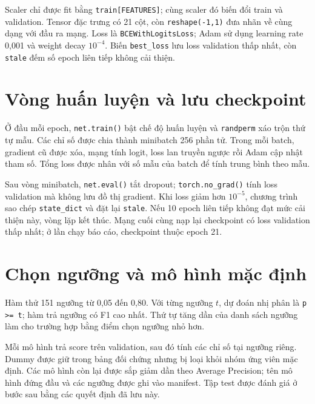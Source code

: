 Scaler chỉ được fit bằng \texttt{train[FEATURES]}; cùng scaler đó biến đổi train và validation. Tensor đặc trưng có 21 cột, còn \texttt{reshape(-1,1)} đưa nhãn về cùng dạng với đầu ra mạng. Loss là \texttt{BCEWithLogitsLoss}; Adam sử dụng learning rate 0,001 và weight decay $10^{-4}$. Biến \texttt{best\_loss} lưu loss validation thấp nhất, còn \texttt{stale} đếm số epoch liên tiếp không cải thiện.

\section{Vòng huấn luyện và lưu checkpoint}

Ở đầu mỗi epoch, \texttt{net.train()} bật chế độ huấn luyện và \texttt{randperm} xáo trộn thứ tự mẫu. Các chỉ số được chia thành minibatch 256 phần tử. Trong mỗi batch, gradient cũ được xóa, mạng tính logit, loss lan truyền ngược rồi Adam cập nhật tham số. Tổng loss được nhân với số mẫu của batch để tính trung bình theo mẫu.

Sau vòng minibatch, \texttt{net.eval()} tắt dropout; \texttt{torch.no\_grad()} tính loss validation mà không lưu đồ thị gradient. Khi loss giảm hơn $10^{-5}$, chương trình sao chép \texttt{state\_dict} và đặt lại \texttt{stale}. Nếu 10 epoch liên tiếp không đạt mức cải thiện này, vòng lặp kết thúc. Mạng cuối cùng nạp lại checkpoint có loss validation thấp nhất; ở lần chạy báo cáo, checkpoint thuộc epoch 21.

\section{Chọn ngưỡng và mô hình mặc định}

Hàm thử 151 ngưỡng từ 0,05 đến 0,80. Với từng ngưỡng $t$, dự đoán nhị phân là \texttt{p >= t}; hàm trả ngưỡng có F1 cao nhất. Thứ tự tăng dần của danh sách ngưỡng làm cho trường hợp bằng điểm chọn ngưỡng nhỏ hơn.


Mỗi mô hình trả score trên validation, sau đó tính các chỉ số tại ngưỡng riêng. Dummy được giữ trong bảng đối chứng nhưng bị loại khỏi nhóm ứng viên mặc định. Các mô hình còn lại được sắp giảm dần theo Average Precision; tên mô hình đứng đầu và các ngưỡng được ghi vào manifest. Tập test được đánh giá ở bước sau bằng các quyết định đã lưu này.


